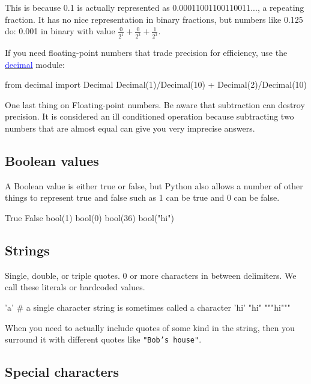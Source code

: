\begin{fullwidth}
\noindent This is because 0.1 is actually represented as 0.00011001100110011..., a repeating fraction.  It has no nice representation in binary fractions, but numbers like 0.125 do: 0.001 in binary with value $\frac{0}{2^1}+\frac{0}{2^2}+\frac{1}{2^3}$.

If you need floating-point numbers that trade precision for efficiency, use the \href{https://docs.python.org/2/library/decimal.html#module-decimal}{\textcolor{blue}{decimal}} module:

\begin{pyconsole}[z2]
from decimal import Decimal
Decimal(1)/Decimal(10) + Decimal(2)/Decimal(10)
\end{pyconsole}

One last thing on Floating-point numbers. Be aware that subtraction can destroy precision. It is considered an ill conditioned operation because subtracting two numbers that are almost equal can give you very imprecise answers.

\subsection{Boolean values}

A Boolean value is either true or false, but Python also allows a number of other things to represent true and false such as 1 can be true and 0 can be false.

\begin{pyconsole}[d]
True
False
bool(1)
bool(0)
bool(36)
bool("hi")
\end{pyconsole}

\subsection{Strings}

Single, double, or triple quotes. 0 or more characters in between delimiters. We call these literals or hardcoded values.

\begin{pyconsole}[e]
'a'  # a single character string is sometimes called a character
'hi'
"hi"
"""hi"""
\end{pyconsole}

When you need to actually include quotes of some kind in the string, then you surround it with different quotes like {\tt "Bob's house"}.

\subsection{Special characters}


\end{fullwidth}
